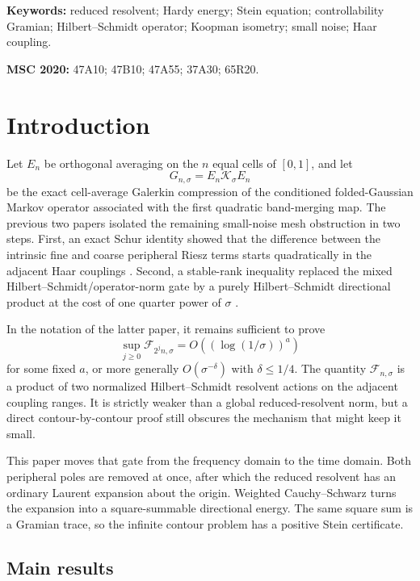 \documentclass[11pt]{article}
\theoremstyle{definition}
\theoremstyle{remark}
\newcommand{\cF}{\mathcal F}
\newcommand{\cK}{\mathcal K}
\begin{document}
\noindent\textbf{Keywords:} reduced resolvent; Hardy energy; Stein equation;
controllability Gramian; Hilbert--Schmidt operator; Koopman isometry;
small noise; Haar coupling.

\medskip
\noindent\textbf{MSC 2020:} 47A10; 47B10; 47A55; 37A30; 65R20.

\section{Introduction}
\label{sec:introduction}

Let \(E_n\) be orthogonal averaging on the \(n\) equal cells of
\([0,1]\), and let
\[
 G_{n,\sigma}=E_n\cK_\sigma E_n
\]
be the exact cell-average Galerkin compression of the conditioned
folded-Gaussian Markov operator associated with the first quadratic
band-merging map.  The previous two papers isolated the remaining
small-noise mesh obstruction in two steps.  First, an exact Schur identity
showed that the difference between the intrinsic fine and coarse peripheral
Riesz terms starts quadratically in the adjacent Haar couplings
\citep{WangIntrinsic2026}.  Second, a stable-rank inequality replaced the
mixed Hilbert--Schmidt/operator-norm gate by a purely Hilbert--Schmidt
directional product at the cost of one quarter power of \(\sigma\)
\citep{WangDirectional2026}.

In the notation of the latter paper, it remains sufficient to prove
\begin{equation}
 \sup_{j\ge0}\cF_{2^jn,\sigma}
 =O((\log(1/\sigma))^a)
 \label{eq:rh49-gate}
\end{equation}
for some fixed \(a\), or more generally
\(O(\sigma^{-\delta})\) with \(\delta\le1/4\).  The quantity
\(\cF_{n,\sigma}\) is a product of two normalized
Hilbert--Schmidt resolvent actions on the adjacent coupling ranges.  It is
strictly weaker than a global reduced-resolvent norm, but a direct
contour-by-contour proof still obscures the mechanism that might keep it
small.

This paper moves that gate from the frequency domain to the time domain.
Both peripheral poles are removed at once, after which the reduced
resolvent has an ordinary Laurent expansion about the origin.  Weighted
Cauchy--Schwarz turns the expansion into a square-summable directional
energy.  The same square sum is a Gramian trace, so the infinite contour
problem has a positive Stein certificate.

\subsection*{Main results}
\end{document}
